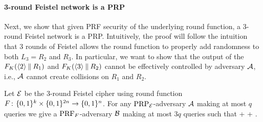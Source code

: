\paragraph{3-round Feistel network is a PRP}
Next, we show that given PRF security of the underlying round function, a 3-round Feistel network is a PRP.
Intuitively, the proof will follow the intuition that 3 rounds of Feistel allows the round function to properly add randomness to both $L_3 = R_2$ and $R_3$.
In particular, we want to show that the output of the $F_{K}(\langle 2 \rangle\: \| \: R_1)$ and $F_{K}(\langle 3 \rangle\: \| \: R_2)$ cannot be effectively controlled by adversary ${\mathcal A}$, i.e., ${\mathcal A}$ cannot create collisions on $R_1$ and $R_2$.

\begin{theorem}\label{thm:luby-rackoff}
Let ${\cal E}$ be the 3-round Feistel cipher using round function
$F{{\kern .05em}\colon{\kern .05em}}\{0,1\}^k\times\{0,1\}^{2n}\rightarrow \{0,1\}^n$. For any
$\textnormal{PRP}_{\cal E}$-adversary ${\mathcal A}$ making at most $q$ queries
we give a $\textnormal{PRF}_{F}$-adversary ${\mathcal B}$ making at most $3q$ queries such that
\bnm
  \AdvPRP{\Feistel}{\advA} \le \AdvPRF{\prf}{\advB} +  +
   \;.
\enm
\end{theorem}


